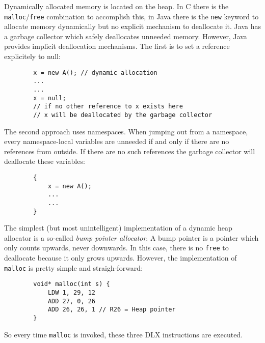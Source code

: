 \par{
	\noindent
	Dynamically allocated memory is located on the heap. In C there is the \texttt{malloc}/\texttt{free} combination to accomplish this, in Java there is the \texttt{new} keyword to allocate memory dynamically but no explicit mechanism to deallocate it. Java has a garbage collector which safely deallocates unneeded memory. However, Java provides implicit deallocation mechanisms. The first is to set a reference explicitely to null:
	\begin{verbatim}
        x = new A(); // dynamic allocation
        ...
        ...
        x = null;
        // if no other reference to x exists here
        // x will be deallocated by the garbage collector
	\end{verbatim}
	The second approach uses namespaces. When jumping out from a namespace, every namespace-local variables are unneeded if and only if there are no references from outside. If there are no such references the garbage collector will deallocate these variables:
	\begin{verbatim}
        {
            x = new A();
            ...
            ...
        }
	\end{verbatim}
}

\par{
    \noindent
    The simplest (but most unintelligent) implementation of a dynamic heap allocator is a so-called \textit{bump pointer allocator}. A bump pointer is a pointer which only counts upwards, never downwards. In this case, there is no \texttt{free} to deallocate because it only grows upwards. However, the implementation of \texttt{malloc} is pretty simple and straigh-forward:
    \begin{verbatim}
        void* malloc(int s) {
            LDW 1, 29, 12
            ADD 27, 0, 26
            ADD 26, 26, 1 // R26 = Heap pointer
        }
    \end{verbatim}
    So every time \texttt{malloc} is invoked, these three DLX instructions are executed.
}
